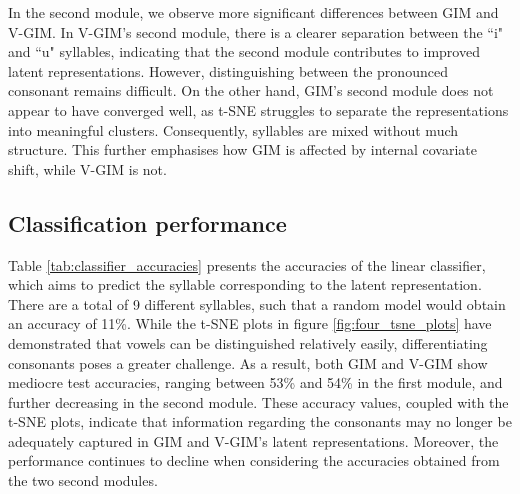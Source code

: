 	In the second module, we observe more significant differences between GIM and V-GIM. In V-GIM's second module, there is a clearer separation between the ``i" and ``u" syllables, indicating that the second module contributes to improved latent representations. However, distinguishing between the pronounced consonant remains difficult. On the other hand, GIM's second module does not appear to have converged well, as t-SNE struggles to separate the representations into meaningful clusters. Consequently, syllables are mixed without much structure. This further emphasises how GIM is affected by internal covariate shift, while V-GIM is not.
	
	
	
		
	
	\subsection{Classification performance} \label{cha:exper_classifier}
	Table \ref{tab:classifier_accuracies} presents the accuracies of the linear classifier, which aims to predict the syllable corresponding to the latent representation. There are a total of 9 different syllables, such that a random model would obtain an accuracy of 11\%. While the t-SNE plots in figure \ref{fig:four_tsne_plots} have demonstrated that vowels can be distinguished relatively easily, differentiating consonants poses a greater challenge. As a result, both GIM and V-GIM show mediocre test accuracies, ranging between 53\% and 54\% in the first module, and further decreasing in the second module. These accuracy values, coupled with the t-SNE plots, indicate that information regarding the consonants may no longer be adequately captured in GIM and V-GIM's latent representations. Moreover, the performance continues to decline when considering the accuracies obtained from the two second modules.
	
	
	
